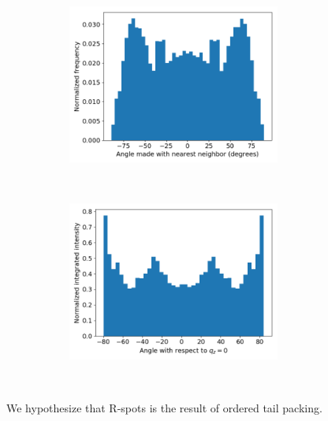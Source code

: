 \documentclass[journal=jpcbfk,manusciprt=article]{achemso}
\begin{document}
\begin{figure}[!htb]
	\begin{subfigure}{\linewidth}
	\centering
		\begin{subfigure}{0.45\textwidth}
	        \centering
		        \includegraphics[width=\linewidth]{angles_traj_layered.png}
		        \caption{}~\label{fig:layered_tails}
		\end{subfigure}
		\begin{subfigure}{0.45\textwidth}
        	\centering
		        \includegraphics[width=\linewidth]{layered_angle_v_I.png}
		        \caption{}~\label{fig:layered_integration}
		\end{subfigure}
	\end{subfigure} 
  \caption{We hypothesize that R-spots is the result of ordered tail packing.
}
\end{figure}
\end{document}
